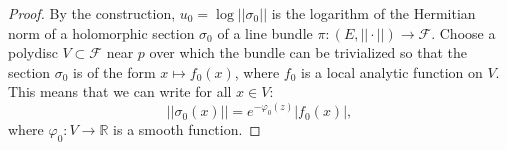 \documentclass[12pt]{amsbook}%
\theoremstyle{definition}
\theoremstyle{remark}
\numberwithin{section}{chapter}
\numberwithin{subsection}{section}
\numberwithin{figure}{chapter}
\DeclareMathOperator{\Th}{Th}
\DeclareMathOperator{\Opp}{Opp}
\DeclareMathOperator{\supp}{supp}
\def\cF{{\mathscr{F}}}
\def\kap{}
\begin{document}
{{\begin{proof}

By the construction, $u_0= \log ||\sigma_0||$ is the logarithm of the Hermitian norm of a holomorphic section $\sigma_0$ of a line bundle $\pi \colon( E, ||\cdot||) \to \cF$.  
Choose a polydisc $V\subset \cF$ near $p$ over which the bundle can be trivialized so that the section $\sigma_0$ is of the form $x \mapsto f_0(x)$, where $f_0$ is a local analytic function on $V$. 
This means that we can write for all $x \in V$:
\begin{equation} \label{eq_herm_norm}
|| \sigma_0(x)|| = e^{-\varphi_0(z)} |f_0(x)|,
\end{equation}
where $\varphi_0 \colon V\to \mathbb{R}$ is a smooth function. 



\end{proof}}}
\end{document}

